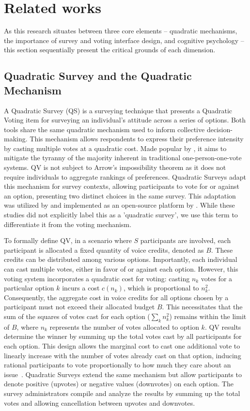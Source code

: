 \section{Related works}
\label{sec:relatedWorks}
As this research situates between three core elements -- quadratic mechanisms, the importance of survey and voting interface design, and cognitive psychology -- this section sequentially present the critical grounds of each dimension.

\subsection{Quadratic Survey and the Quadratic Mechanism}
A Quadratic Survey (QS) is a surveying technique that presents a Quadratic Voting item for surveying an individual's attitude across a series of options. Both tools share the same quadratic mechanism used to inform collective decision-making. This mechanism allows respondents to express their preference intensity by casting multiple votes at a quadratic cost. Made popular by \textcite{posner2018radical, lalley2018quadratic}, it aims to mitigate the tyranny of the majority inherent in traditional one-person-one-vote systems. QV is not subject to Arrow's impossibility theorem as it does not require individuals to aggregate rankings of preferences. Quadratic Surveys adapt this mechanism for survey contexts, allowing participants to vote for or against an option, presenting two distinct choices in the same survey. This adaptation was utilized by \textcite{quarfoot2017quadratic} and implemented as an open-source platform by \textcite{bassettiCivicbaseOpensourcePlatform2023}. While these studies did not explicitly label this as a 'quadratic survey', we use this term to differentiate it from the voting mechanism.

To formally define QV, in a scenario where $S$ participants are involved, each participant is allocated a fixed quantity of voice credits, denoted as $B$. These credits can be distributed among various options. Importantly, each individual can cast multiple votes, either in favor of or against each option. However, this voting system incorporates a quadratic cost for voting: casting $n_k$ votes for a particular option $k$ incurs a cost $c(n_k)$, which is proportional to $n_k^2$. Consequently, the aggregate cost in voice credits for all options chosen by a participant must not exceed their allocated budget $B$. This necessitates that the sum of the squares of votes cast for each option ($\sum_k n_k^2$) remains within the limit of $B$, where $n_k$ represents the number of votes allocated to option $k$. QV results determine the winner by summing up the total votes cast by all participants for each option. This design allows the marginal cost to cast one additional vote to linearly increase with the number of votes already cast on that option, inducing rational participants to vote proportionally to how much they care about an issue~\cite{posner2018radical}. Quadratic Surveys extend the same mechanism but allow participants to denote positive (upvotes) or negative values (downvotes) on each option. The survey administrators compile and analyze the results by summing up the total votes and allowing cancellation between upvotes and downvotes.

